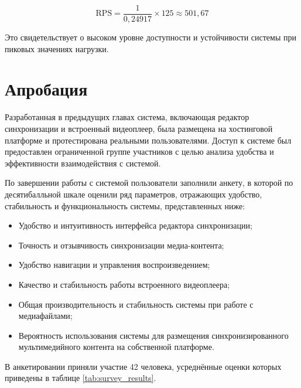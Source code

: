 	\[
	\text{RPS} = \frac{1}{0{,}24917} \times 125 \approx 501{,}67
	\]

	Это свидетельствует о высоком уровне доступности и устойчивости системы при пиковых значениях нагрузки.

	\section{Апробация}

	Разработанная в предыдущих главах система, включающая редактор синхронизации и встроенный видеоплеер, была размещена на хостинговой платформе и протестирована реальными пользователями. Доступ к системе был предоставлен ограниченной группе участников с целью анализа удобства и эффективности взаимодействия с системой.

	По завершении работы с системой пользователи заполнили анкету, в которой по десятибалльной шкале оценили ряд параметров, отражающих удобство, стабильность и функциональность системы, представленных ниже:

	\begin{itemize}[label=$\bullet$]
		\item Удобство и интуитивность интерфейса редактора синхронизации;
		\item Точность и отзывчивость синхронизации медиа-контента;
		\item Удобство навигации и управления воспроизведением;
		\item Качество и стабильность работы встроенного видеоплеера;
		\item Общая производительность и стабильность системы при работе с медиафайлами;
		\item Вероятность использования системы для размещения синхронизированного мультимедийного контента на собственной платформе.
	\end{itemize}

	В анкетировании приняли участие 42 человека, усреднённые оценки которых приведены в таблице \ref{tab:survey_results}.

